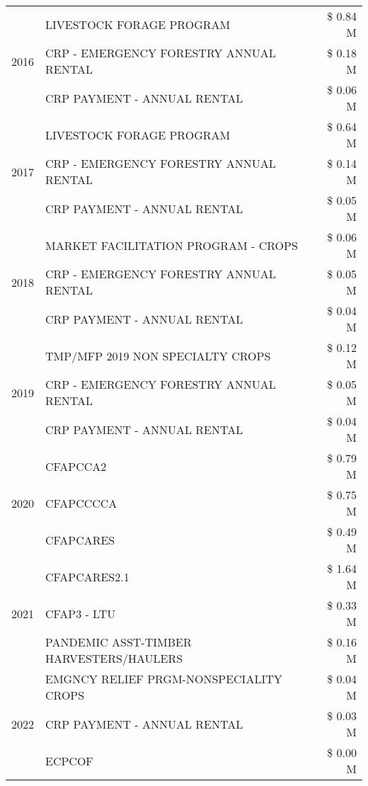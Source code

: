 \begin{tabular}{llr}
\cline{1-3}
\multirow[t]{3}{*}{2016} & LIVESTOCK FORAGE PROGRAM & \$ 0.84 M \\
 & CRP - EMERGENCY FORESTRY ANNUAL RENTAL & \$ 0.18 M \\
 & CRP PAYMENT - ANNUAL RENTAL & \$ 0.06 M \\
\cline{1-3}
\multirow[t]{3}{*}{2017} & LIVESTOCK FORAGE PROGRAM & \$ 0.64 M \\
 & CRP - EMERGENCY FORESTRY ANNUAL RENTAL & \$ 0.14 M \\
 & CRP PAYMENT - ANNUAL RENTAL & \$ 0.05 M \\
\cline{1-3}
\multirow[t]{3}{*}{2018} & MARKET FACILITATION PROGRAM - CROPS & \$ 0.06 M \\
 & CRP - EMERGENCY FORESTRY ANNUAL RENTAL & \$ 0.05 M \\
 & CRP PAYMENT - ANNUAL RENTAL & \$ 0.04 M \\
\cline{1-3}
\multirow[t]{3}{*}{2019} & TMP/MFP 2019 NON SPECIALTY CROPS & \$ 0.12 M \\
 & CRP - EMERGENCY FORESTRY ANNUAL RENTAL & \$ 0.05 M \\
 & CRP PAYMENT - ANNUAL RENTAL & \$ 0.04 M \\
\cline{1-3}
\multirow[t]{3}{*}{2020} & CFAPCCA2 & \$ 0.79 M \\
 & CFAPCCCCA & \$ 0.75 M \\
 & CFAPCARES & \$ 0.49 M \\
\cline{1-3}
\multirow[t]{3}{*}{2021} & CFAPCARES2.1 & \$ 1.64 M \\
 & CFAP3 - LTU & \$ 0.33 M \\
 & PANDEMIC ASST-TIMBER HARVESTERS/HAULERS & \$ 0.16 M \\
\cline{1-3}
\multirow[t]{3}{*}{2022} & EMGNCY RELIEF PRGM-NONSPECIALITY CROPS & \$ 0.04 M \\
 & CRP PAYMENT - ANNUAL RENTAL & \$ 0.03 M \\
 & ECPCOF & \$ 0.00 M \\
\cline{1-3}
\bottomrule
\end{tabular}
